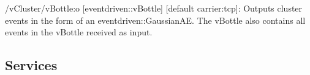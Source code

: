 \begin{DoxyItemize}
\item /v\+Cluster/v\+Bottle\+:o \mbox{[}eventdriven\+::v\+Bottle\mbox{]} \mbox{[}default carrier\+:tcp\mbox{]}\+: Outputs cluster events in the form of an eventdriven\+::\+Gaussian\+AE. The v\+Bottle also contains all events in the v\+Bottle received as input.
\end{DoxyItemize}\hypertarget{group__zynqGrabber_services_sec}{}\subsection{Services}\label{group__zynqGrabber_services_sec}
